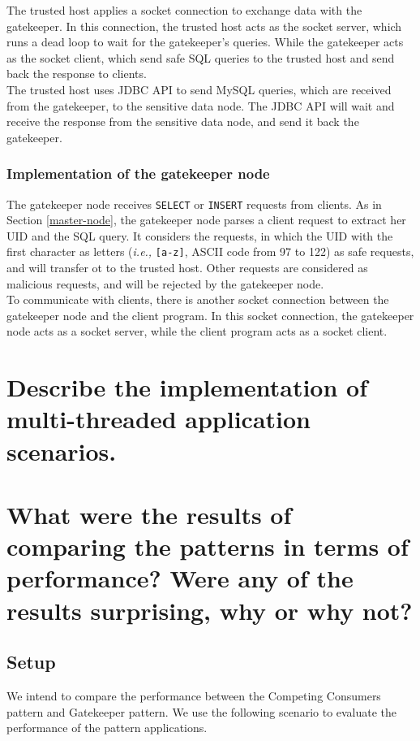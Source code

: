 \documentclass{article}
\begin{document}
The trusted host applies a socket connection to exchange data with the gatekeeper. In this connection, the trusted host acts as the socket server, which runs a dead loop to wait for the gatekeeper's queries. While the gatekeeper acts as the socket client, which send safe SQL queries to the trusted host and send back the response to clients.\\

The trusted host uses JDBC API to send MySQL queries, which are received from the gatekeeper, to the sensitive data node. The JDBC API will wait and receive the response from the sensitive data node, and send it back the gatekeeper.

\subsubsection{Implementation of the gatekeeper node}
The gatekeeper node receives \texttt{SELECT} or \texttt{INSERT} requests from clients. As in Section \ref{master-node}, the gatekeeper node parses a client request to extract her UID and the SQL query. It considers the requests, in which the UID with the first character as letters (\emph{i.e.,} \texttt{[a-z]}, ASCII code from 97 to 122) as safe requests, and will transfer ot to the trusted host. Other requests are considered as malicious requests, and will be rejected by the gatekeeper node. \\

To communicate with clients, there is another socket connection between the gatekeeper node and the client program. In this socket connection, the gatekeeper node acts as a socket server, while the client program acts as a socket client.


\section{Describe the implementation of multi-threaded application scenarios.}\label{Q4}

\section{What were the results of comparing the patterns in terms of performance? Were any of the results surprising, why or why not?}\label{Q5}

\subsection{Setup}
We intend to compare the performance between the Competing Consumers pattern and Gatekeeper pattern. We use the following scenario to evaluate the performance of the pattern applications. 
\end{document}
